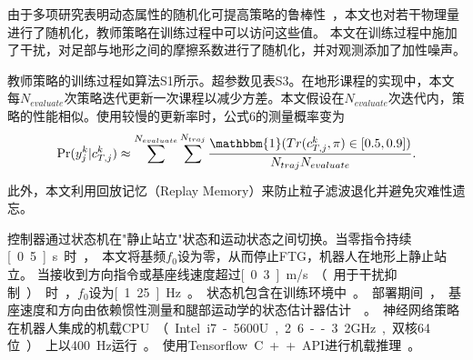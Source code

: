 \documentclass[9pt,twocolumn,twoside]{osajnl}
\begin{document}
由于多项研究表明动态属性的随机化可提高策略的鲁棒性~\cite{hwangbo2019learning,tan2018sim}，本文也对若干物理量进行了随机化，教师策略在训练过程中可以访问这些值。
本文在训练过程中施加了干扰，对足部与地形之间的摩擦系数进行了随机化，并对观测添加了加性噪声。

教师策略的训练过程如算法S1所示。超参数见表S3。在地形课程的实现中，本文每$N_{evaluate}$次策略迭代更新一次课程以减少方差。本文假设在$N_{evaluate}$次迭代内，策略的性能相似。使用较慢的更新率时，公式6的测量概率变为
\begin{equation}
    \Pr(y_j^k|c_{T,j}^k)
    \approx
    \sum_{}^{N_{evaluate}}
     \sum_{}^{N_{traj}}
     \frac{\mathbbm{1} (Tr(c_{T,j}^k,\pi) \in [0.5, 0.9])}{ N_{traj} N_{evaluate}}.
\label{measurement_model3}\end{equation} 此外，本文利用回放记忆（Replay Memory）来防止粒子滤波退化并避免灾难性遗忘。

控制器通过状态机在"静止站立"状态和运动状态之间切换。当零指令持续\unit[0.5]{s}时，本文将基频$f_0$设为零，从而停止FTG，机器人在地形上静止站立。
当接收到方向指令或基座线速度超过\unit[0.3]{m/s}（用于干扰抑制）时，$f_0$设为\unit[1.25]{Hz}。状态机包含在训练环境中。

部署期间，基座速度和方向由依赖惯性测量和腿部运动学的状态估计器估计~\cite{bloesch2013state}。

神经网络策略在机器人集成的机载CPU（Intel i7-5600U, 2.6 -- 3.2GHz, 双核64位）上以400 Hz运行。使用Tensorflow C++ API进行机载推理。


\begin{algorithm}
\caption{带自动地形课程的教师训练}
\label{algo:TPF}
\end{algorithm}
\end{document}

